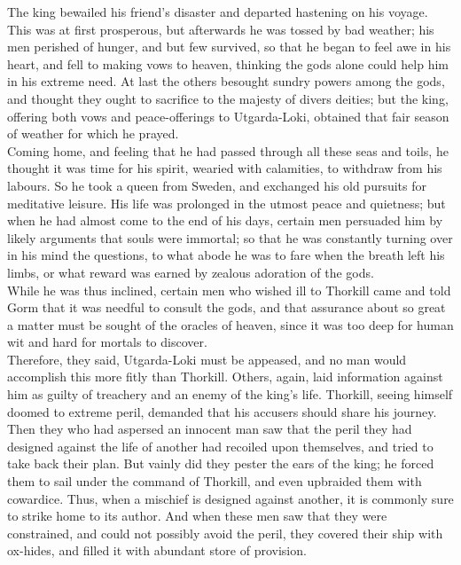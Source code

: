 \documentclass[10pt,a4paper]{report}
\begin{document}
The king bewailed his friend's disaster and departed hastening on his voyage. This was at first prosperous, but afterwards he was tossed by bad weather; his men perished of hunger, and but few survived, so that he began to feel awe in his heart, and fell to making vows to heaven, thinking the gods alone could help him in his extreme need. At last the others besought sundry powers among the gods, and thought they ought to sacrifice to the majesty of divers deities; but the king, offering both vows and peace-offerings to Utgarda-Loki, obtained that fair season of weather for which he prayed.\\

Coming home, and feeling that he had passed through all these seas and toils, he thought it was time for his spirit, wearied with calamities, to withdraw from his labours. So he took a queen from Sweden, and exchanged his old pursuits for meditative leisure. His life was prolonged in the utmost peace and quietness; but when he had almost come to the end of his days, certain men persuaded him by likely arguments that souls were immortal; so that he was constantly turning over in his mind the questions, to what abode he was to fare when the breath left his limbs, or what reward was earned by zealous adoration of the gods.\\

While he was thus inclined, certain men who wished ill to Thorkill came and told Gorm that it was needful to consult the gods, and that assurance about so great a matter must be sought of the oracles of heaven, since it was too deep for human wit and hard for mortals to discover.\\

Therefore, they said, Utgarda-Loki must be appeased, and no man would accomplish this more fitly than Thorkill. Others, again, laid information against him as guilty of treachery and an enemy of the king's life. Thorkill, seeing himself doomed to extreme peril, demanded that his accusers should share his journey. Then they who had aspersed an innocent man saw that the peril they had designed against the life of another had recoiled upon themselves, and tried to take back their plan. But vainly did they pester the ears of the king; he forced them to sail under the command of Thorkill, and even upbraided them with cowardice. Thus, when a mischief is designed against another, it is commonly sure to strike home to its author. And when these men saw that they were constrained, and could not possibly avoid the peril, they covered their ship with ox-hides, and filled it with abundant store of provision.\\
\end{document}
